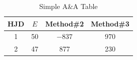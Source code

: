 \documentclass{aa}
\begin{document}
\begin{table}[ht!]
	\caption{Simple A\&A Table}                 %
	\label{table:1}    %
	\centering                        %
	\begin{tabular}{c c c c}      %
		\hline\hline               %
		HJD & $E$ & Method\#2 & Method\#3 \\         %
		\hline                      %
		1   & 50  & $-837$    & 970       \\    %
		2   & 47  & 877       & 230       \\
		\hline                                  %
	\end{tabular}
\end{table}
\end{document}

